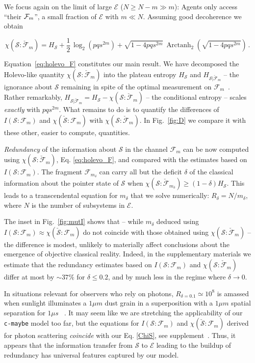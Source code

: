 \documentclass[aps,prl,showpacs,amsmath,amssymb,amsfonts,lengthcheck,twocolumn,longbibliography,superscriptaddress]{revtex4-2}
\newcommand{\cS}        {{\mathcal S}}
\newcommand{\cE}        {{\mathcal E}}
\newcommand{\+}         {\dagger}
\newcommand\cF{{\mathcal F}}
\newcommand{\mc}[1]{\mathcal{#1}}
\begin{document}
We focus again on the limit of large $\cE$ ($N \ge N-m \gg m$): Agents only access ``their ${\cal F}_m$'', a small fraction of $\cE$ with $m \ll N$.  Assuming good decoherence we obtain
\begin{widetext}
\begin{equation}
\label{eq:holevo_F}
\chi(\mc{S}:\check \cF_m)= H_\cS +\frac{1}{2}\, \log_{2}\left(pqs^{2m}\right) +\sqrt{1-4pqs^{2m}}\,\operatorname{Arctanh}_2\left(\sqrt{1-4pqs^{2m}}\right)\,.
\end{equation}
\end{widetext}
Equation~\eqref{eq:holevo_F} constitutes our main result. We have decomposed the Holevo-like quantity $\chi(\mc{S}:\check \cF_m)$ into the plateau entropy $H_\cS$ and $H_{\cS|{\check \cF_m}}$ -- the ignorance about $\cS$ remaining in spite of the optimal measurement on $\cF_m$~\cite{elaborate}. Rather remarkably,  $H_{\cS|{\check \cF_m}}= H_\cS - \chi(\mc{S}: \check {\mc{F}}_m) $ -- the conditional entropy -- scales {\it exactly} with $pqs^{2m}$. What remains to do is to quantify the differences of $I({\mc{S}}:\mc{F}_m)$ and  $\chi (\check \cS:\mc{F}_m)$ with  $\chi(\mc{S}:\check \cF_m)$. In Fig.~\ref{fig:D} we compare it with these other, easier to compute, quantities. 

{\it Redundancy} of the information about $\cS$ in the channel $\cF_m$ can be now computed using $\chi(\mc{S}:\check \cF_m)$, Eq. \eqref{eq:holevo_F}, and compared with the estimates based on $I(\cS:\cF_m)$. The fragment $\cF_{m_\delta}$ can carry all but the deficit $\delta$ of the classical information about the pointer state of $\cS$ when $\chi(\mc{S}:\check \cF_{m_\delta})\ge(1-\delta) H_\cS$. This leads to a transcendental equation for $m_\delta$ that we solve numerically: $R_\delta = N / m_{\delta}$, where $N$ is the number of subsystems in $\cE$.

The inset in Fig.~\ref{fig:mutI} shows that -- while $m_\delta$ deduced using $I(\cS:\cF_m)\approx \chi (\check \cS:\mc{F}_m)$ do not coincide with those obtained using $\chi(\mc{S}:\check \cF_m)$ -- the difference is modest, unlikely to materially affect conclusions about the emergence of objective classical reality. Indeed, in the supplementary materials we estimate that the redundancy estimates based on $I(\cS:\cF_m)$ and $\chi(\mc{S}:\check \cF_m)$ differ at most by $\sim 37\%$ for $\delta \leq 0.2$,
and by much less in the regime where $\delta \rightarrow 0$.

In situations relevant for observers who rely on photons, $R_{\delta=0.1} \simeq 10^8$ is amassed when sunlight illuminates a $1\mu m$ dust grain in a superposition with a $1\mu m$ spatial separation for $1 \mu s$ ~\cite{Riedel2010PRL,Riedel2011NJP}. It may seem like we are stretching the applicability of our {\tt c-maybe} model too far, but the equations for $I({\mc{S}}:\mc{F}_m)$ and $\chi (\check \cS:\mc{F}_m)$ derived for photon scattering {\it coincide } with our Eq. \eqref{ChiS}, see supplement~\cite{SM}. Thus, it appears that the information transfer from $\cS$ to $\cE$ leading to the buildup of redundancy has universal features captured by our model. 
\end{document}
